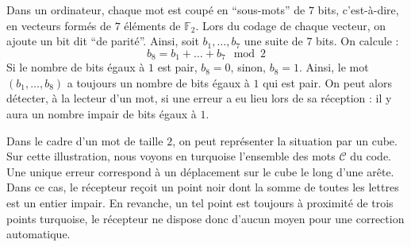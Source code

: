 	\begin{example}
		Dans un ordinateur, chaque mot est coupé en ``sous-mots'' de $7$ bits, c'est-à-dire, en vecteurs formés de $7$ éléments de $\mathbb{F}_2$. Lors du codage de chaque vecteur, on ajoute un bit dit ``de parité''.
		\newpar
		Ainsi, soit $b_1, \dots, b_7$ une suite de $7$ bits. On calcule :
		\[ b_8 = b_1 + \dots + b_7 \mod 2 \]
		Si le nombre de bits égaux à $1$ est pair, $b_8 = 0$, sinon, $b_8 = 1$. Ainsi, le mot $(b_1, \dots, b_8)$ a toujours un nombre de bits égaux à $1$ qui est pair. On peut alors détecter, à la lecteur d'un mot, si une erreur a eu lieu lors de sa réception : il y aura un nombre impair de bits égaux à $1$.
		\begin{center}
			\begin{minipage}{0.45\textwidth}
				Dans le cadre d'un mot de taille $2$, on peut représenter la situation par un cube. Sur cette illustration, nous voyons en turquoise l'ensemble des mots $\mathcal{C}$ du code. Une unique erreur correspond à un déplacement sur le cube le long d'une arête. Dans ce cas, le récepteur reçoit un point noir dont la somme de toutes les lettres est un entier impair. En revanche, un tel point est toujours à proximité de trois points turquoise, le récepteur ne dispose donc d'aucun moyen pour une correction automatique.
			\end{minipage}
			\hfill
			\begin{minipage}{0.45\textwidth}
				\begin{figure}[H]
					\begin{center}

\end{center}
\end{figure}
\end{minipage}
\end{center}
\end{example}
